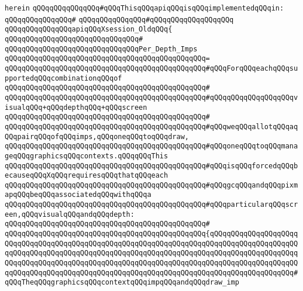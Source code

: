 \verb|herein|\newline
\newline
\verb|qQQqqQQqqQQqqQQq#qQQqThisqQQqapiqQQqisqQQqimplementedqQQqin:|\newline
\verb|qQQqqQQqqQQqqQQq#|\newline
\verb|qQQqqQQqqQQqqQQq#qQQqqQQqqQQqqQQqqQQq|\newline
\newline
\verb|qQQqqQQqqQQqqQQqapiqQQqXsession_OldqQQq{|\newline
\verb|qQQqqQQqqQQqqQQqqQQqqQQqqQQqqQQq#|\newline
\verb|qQQqqQQqqQQqqQQqqQQqqQQqqQQqqQQqPer_Depth_Imps|\newline
\verb|qQQqqQQqqQQqqQQqqQQqqQQqqQQqqQQqqQQqqQQqqQQqqQQq=|\newline
\verb|qQQqqQQqqQQqqQQqqQQqqQQqqQQqqQQqqQQqqQQqqQQqqQQq#qQQqForqQQqeachqQQqsupportedqQQqcombinationqQQqof|\newline
\verb|qQQqqQQqqQQqqQQqqQQqqQQqqQQqqQQqqQQqqQQqqQQqqQQq#|\newline
\verb|qQQqqQQqqQQqqQQqqQQqqQQqqQQqqQQqqQQqqQQqqQQqqQQq#qQQqqQQqqQQqqQQqqQQqvisualqQQq+qQQqdepthqQQq+qQQqscreen|\newline
\verb|qQQqqQQqqQQqqQQqqQQqqQQqqQQqqQQqqQQqqQQqqQQqqQQq#|\newline
\verb|qQQqqQQqqQQqqQQqqQQqqQQqqQQqqQQqqQQqqQQqqQQqqQQq#qQQqweqQQqallotqQQqaqQQqpairqQQqofqQQqimps,qQQqoneqQQqtoqQQqdraw,|\newline
\verb|qQQqqQQqqQQqqQQqqQQqqQQqqQQqqQQqqQQqqQQqqQQqqQQq#qQQqoneqQQqtoqQQqmanageqQQqgraphicsqQQqcontexts.qQQqqQQqThis|\newline
\verb|qQQqqQQqqQQqqQQqqQQqqQQqqQQqqQQqqQQqqQQqqQQqqQQq#qQQqisqQQqforcedqQQqbecauseqQQqXqQQqrequiresqQQqthatqQQqeach|\newline
\verb|qQQqqQQqqQQqqQQqqQQqqQQqqQQqqQQqqQQqqQQqqQQqqQQq#qQQqgcqQQqandqQQqpixmapqQQqbeqQQqassociatedqQQqwithqQQqa|\newline
\verb|qQQqqQQqqQQqqQQqqQQqqQQqqQQqqQQqqQQqqQQqqQQqqQQq#qQQqparticularqQQqscreen,qQQqvisualqQQqandqQQqdepth:|\newline
\verb|qQQqqQQqqQQqqQQqqQQqqQQqqQQqqQQqqQQqqQQqqQQqqQQq#|\newline
\verb|qQQqqQQqqQQqqQQqqQQqqQQqqQQqqQQqqQQqqQQqqQQqqQQq{qQQqqQQqqQQqqQQqqQQqqQQqqQQqqQQqqQQqqQQqqQQqqQQqqQQqqQQqqQQqqQQqqQQqqQQqqQQqqQQqqQQqqQQqqQQqqQQqqQQqqQQqqQQqqQQqqQQqqQQqqQQqqQQqqQQqqQQqqQQqqQQqqQQqqQQqqQQqqQQqqQQqqQQqqQQqqQQqqQQqqQQqqQQqqQQqqQQqqQQqqQQqqQQqqQQqqQQqqQQqqQQqqQQqqQQqqQQqqQQqqQQqqQQqqQQqqQQqqQQqqQQqqQQqqQQqqQQqqQQqqQQqqQQqqQQqqQQqqQQq#qQQqTheqQQqgraphicsqQQqcontextqQQqimpqQQqandqQQqdraw_imp|\newline

